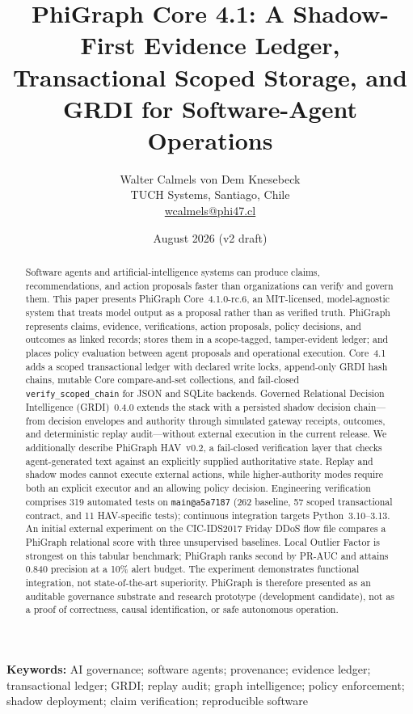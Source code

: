\documentclass[11pt]{article}
\title{\textbf{PhiGraph Core 4.1: A Shadow-First Evidence Ledger,\\Transactional Scoped Storage, and GRDI for Software-Agent Operations}}
\author{
  Walter Calmels von Dem Knesebeck\\
  TUCH Systems, Santiago, Chile\\
  \href{mailto:wcalmels@phi47.cl}{wcalmels@phi47.cl}
}
\date{August 2026 (v2 draft)}
\begin{document}
\maketitle

\begin{abstract}
Software agents and artificial-intelligence systems can produce claims,
recommendations, and action proposals faster than organizations can verify and
govern them. This paper presents PhiGraph Core~4.1.0-rc.6, an MIT-licensed,
model-agnostic system that treats model output as a proposal rather than as
verified truth. PhiGraph represents claims, evidence, verifications, action
proposals, policy decisions, and outcomes as linked records; stores them in a
scope-tagged, tamper-evident ledger; and places policy evaluation between agent
proposals and operational execution. Core~4.1 adds a scoped transactional
ledger with declared write locks, append-only GRDI hash chains, mutable Core
compare-and-set collections, and fail-closed \texttt{verify\_scoped\_chain}
for JSON and SQLite backends. Governed Relational Decision Intelligence
(GRDI)~0.4.0 extends the stack with a persisted shadow decision chain---from
decision envelopes and authority through simulated gateway receipts, outcomes,
and deterministic replay audit---without external execution in the current
release. We additionally describe PhiGraph HAV~v0.2, a fail-closed verification
layer that checks agent-generated text against an explicitly supplied
authoritative state. Replay and shadow modes cannot execute external actions,
while higher-authority modes require both an explicit executor and an allowing
policy decision. Engineering verification comprises 319 automated tests on
\texttt{main@a5a7187} (262 baseline, 57 scoped transactional contract, and 11
HAV-specific tests); continuous integration targets Python~3.10--3.13. An
initial external experiment on the CIC-IDS2017 Friday DDoS flow file compares a
PhiGraph relational score with three unsupervised baselines. Local Outlier
Factor is strongest on this tabular benchmark; PhiGraph ranks second by PR-AUC
and attains 0.840 precision at a 10\% alert budget. The experiment
demonstrates functional integration, not state-of-the-art superiority. PhiGraph
is therefore presented as an auditable governance substrate and research
prototype (development candidate), not as a proof of correctness, causal
identification, or safe autonomous operation.
\end{abstract}

\noindent\textbf{Keywords:} AI governance; software agents; provenance;
evidence ledger; transactional ledger; GRDI; replay audit; graph intelligence;
policy enforcement; shadow deployment; claim verification; reproducible software
\end{document}
